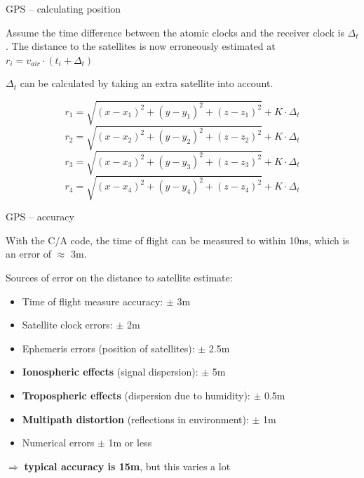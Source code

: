 \documentclass[compress]{beamer}
\begin{document}
\begin{frame}{GPS -- calculating position}
{            Assume the time difference between the atomic clocks and the receiver clock is
            $\Delta_t$. The distance to the satellites is now erroneously estimated
            at $r_i = v_{air}\cdot (t_i + \Delta_t)$

            $\Delta_t$ can be calculated by taking an extra satellite into account.

            \[
                r_1 = \sqrt{(x-x_1)^2 + (y - y_1)^2 + (z - z_1)^2} + K\cdot\Delta_t
            \]\[
            r_2 = \sqrt{(x-x_2)^2 + (y - y_2)^2 + (z - z_2)^2} + K\cdot\Delta_t
        \]\[
        r_3 = \sqrt{(x-x_3)^2 + (y - y_3)^2 + (z - z_3)^2} + K\cdot\Delta_t
    \]\[
    r_4 = \sqrt{(x-x_4)^2 + (y - y_4)^2 + (z - z_4)^2} + K\cdot\Delta_t
    \]

}
\end{frame}

\begin{frame}{GPS -- accuracy}

    With the C/A code, the time of flight can be measured to within 10ns,
    which is an error of $\approx$ 3m.

    Sources of error on the distance to satellite estimate:

    \begin{itemize}

        \item Time of flight measure accuracy: $\pm$ 3m
        \item Satellite clock errors: $\pm$ 2m
        \item Ephemeris errors (position of satellites): $\pm$ 2.5m
        \item \textbf<2>{Ionospheric effects} (signal dispersion): $\pm$ 5m
        \item \textbf<2>{Tropospheric effects} (dispersion due to humidity): $\pm$ 0.5m
        \item \textbf<2>{Multipath distortion} (reflections in environment): $\pm$ 1m
        \item Numerical errors $\pm$ 1m or less
    \end{itemize}

    $\Rightarrow$ {\bf typical accuracy is 15m}, but this varies a lot

\end{frame}
\end{document}

